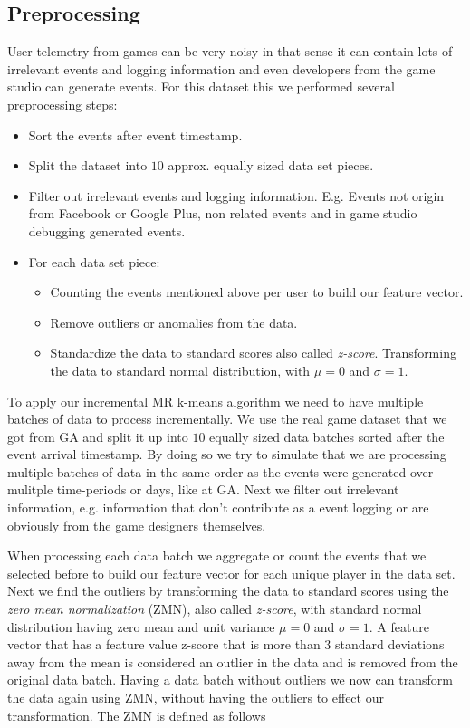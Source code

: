 \subsection{Preprocessing}
\label{preprocessing}
User telemetry from games can be very noisy in that sense it can contain lots of irrelevant events and logging information and even developers from the game studio can generate events. For this dataset this we performed several preprocessing steps:
\begin{itemize}
\item Sort the events after event timestamp.
\item Split the dataset into $10$ approx. equally sized data set pieces.
\item Filter out irrelevant events and logging information. E.g. Events not origin from Facebook or Google Plus, non related events and in game studio debugging generated events.
\item For each data set piece:
 \begin{itemize}
 \item Counting the events mentioned above per user to build our feature vector.
 \item Remove outliers or anomalies from the data.
 \item Standardize the data to standard scores also called \textit{z-score}. Transforming the data
to standard normal distribution, with $\mu = 0$ and $\sigma = 1$. 
 \end{itemize}
\end{itemize}

To apply our incremental MR k-means algorithm we need to have multiple batches of data to process incrementally. We use the real game dataset that we got from GA and split it up into $10$ equally sized data batches sorted after the event arrival timestamp. By doing so we try to simulate that we are processing multiple batches of data in the same order as the events were generated over mulitple time-periods or days, like at GA. Next we filter out irrelevant information, e.g. information that don't contribute as a event logging or are obviously from the game designers themselves.

When processing each data batch we aggregate or count the events that we selected before to build our feature vector for each unique player in the data set. Next we find the outliers by transforming the data to standard scores using the \textit{zero mean normalization} (ZMN), also called \textit{z-score}, with standard normal distribution having zero mean and unit variance $\mu = 0$ and $\sigma = 1$. A feature vector that has a feature value z-score that is more than $3$ standard deviations away from the mean is considered an outlier in the data and is removed from the original data batch. Having a data batch without outliers we now can transform the data again using ZMN, without having the outliers to effect our transformation. The ZMN is defined as follows


